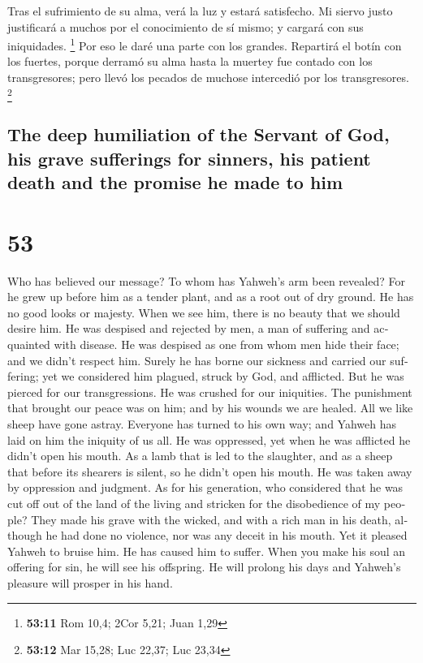 \begin{paracol}{2}
 Tras el sufrimiento de su alma, verá la luz y estará
satisfecho. Mi siervo justo justificará a muchos por el conocimiento de
sí mismo; y cargará con sus iniquidades. \footnote{\textbf{53:11} Rom
  10,4; 2Cor 5,21; Juan 1,29}  Por eso le daré una parte
con los grandes. Repartirá el botín con los fuertes, porque derramó su
alma hasta la muertey fue contado con los transgresores; pero llevó los
pecados de muchose intercedió por los transgresores. \footnote{\textbf{53:12}
  Mar 15,28; Luc 22,37; Luc 23,34}

\switchcolumn
\begin{otherlanguage}{english}

\hypertarget{the-deep-humiliation-of-the-servant-of-god-his-grave-sufferings-for-sinners-his-patient-death-and-the-promise-he-made-to-him}{%
\subsection{The deep humiliation of the Servant of God, his grave
sufferings for sinners, his patient death and the promise he made to
him}\label{the-deep-humiliation-of-the-servant-of-god-his-grave-sufferings-for-sinners-his-patient-death-and-the-promise-he-made-to-him}}

\hypertarget{section-105}{%
\section{53}\label{section-105}}

 Who has believed our message? To whom has Yahweh's arm
been revealed?  For he grew up before him as a tender
plant, and as a root out of dry ground. He has no good looks or majesty.
When we see him, there is no beauty that we should desire him.
 He was despised and rejected by men, a man of suffering
and acquainted with disease. He was despised as one from whom men hide
their face; and we didn't respect him.  Surely he has
borne our sickness and carried our suffering; yet we considered him
plagued, struck by God, and afflicted.  But he was pierced
for our transgressions. He was crushed for our iniquities. The
punishment that brought our peace was on him; and by his wounds we are
healed.  All we like sheep have gone astray. Everyone has
turned to his own way; and Yahweh has laid on him the iniquity of us
all.  He was oppressed, yet when he was afflicted he
didn't open his mouth. As a lamb that is led to the slaughter, and as a
sheep that before its shearers is silent, so he didn't open his mouth.
 He was taken away by oppression and judgment. As for his
generation, who considered that he was cut off out of the land of the
living and stricken for the disobedience of my people? 
They made his grave with the wicked, and with a rich man in his death,
although he had done no violence, nor was any deceit in his mouth.
 Yet it pleased Yahweh to bruise him. He has caused him
to suffer. When you make his soul an offering for sin, he will see his
offspring. He will prolong his days and Yahweh's pleasure will prosper
in his hand.


\end{otherlanguage}
\end{paracol}
